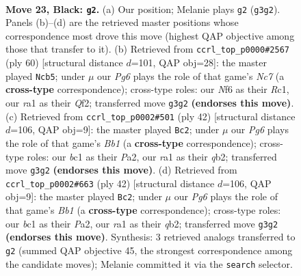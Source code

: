 \documentclass[11pt]{article}
\begin{document}
\clearpage

\begin{figure}[p]\centering
\begin{subfigure}{0.46\textwidth}\centering
\resizebox{\linewidth}{!}{%
\newchessgame
\chessboard[
  setfen={r1qk1b1r/p4pp1/3P1n1p/5P1P/B1n2Q2/6p1/8/R1B1K1NR b KQ - 4 23},
  showmover=false,
  pgfstyle=straightmove, color=movearrow, markmove={g3-g2}
]}
\caption{}
\end{subfigure}\hfill
\begin{subfigure}{0.46\textwidth}\centering
\resizebox{\linewidth}{!}{%
\newchessgame
\chessboard[
  setfen={1r4k1/2N1qpb1/3N2pp/3RP3/b4P2/r1p5/P4QPP/2R3K1 w - - 8 31},
  showmover=false,
  pgfstyle=straightmove, color=movearrow, markmove={c7-b5}
]}
\caption{}
\end{subfigure}
\\[4pt]
\begin{subfigure}{0.46\textwidth}\centering
\resizebox{\linewidth}{!}{%
\newchessgame
\chessboard[
  setfen={r1b2rk1/pp3p2/6p1/3PN2P/1b2N3/8/Pq2KP2/RB1Q3R w - - 0 22},
  showmover=false,
  pgfstyle=straightmove, color=movearrow, markmove={b1-c2}
]}
\caption{}
\end{subfigure}\hfill
\begin{subfigure}{0.46\textwidth}\centering
\resizebox{\linewidth}{!}{%
\newchessgame
\chessboard[
  setfen={r1b2rk1/pp3p2/6p1/3PN2P/1b2N3/8/Pq2KP2/RB1Q3R w - - 0 22},
  showmover=false,
  pgfstyle=straightmove, color=movearrow, markmove={b1-c2}
]}
\caption{}
\end{subfigure}
\caption{\textbf{Move 23, Black: \texttt{g2}.} (a) Our position; Melanie plays \texttt{g2} (\texttt{g3g2}). Panels (b)--(d) are the retrieved master positions whose correspondence most drove this move (highest QAP objective among those that transfer to it). (b) Retrieved from \texttt{ccrl\_top\_p0000\#2567} (ply 60) [structural distance $d$=101, QAP obj=28]: the master played \texttt{Ncb5}; under $\mu$ our \emph{Pg6} plays the role of that game's \emph{Nc7} (a \textbf{cross-type} correspondence); cross-type roles: our \emph{N}f6 as their \emph{R}c1, our \emph{r}a1 as their \emph{Q}f2; transferred move \texttt{g3g2} \textbf{(endorses this move)}. (c) Retrieved from \texttt{ccrl\_top\_p0002\#501} (ply 42) [structural distance $d$=106, QAP obj=9]: the master played \texttt{Bc2}; under $\mu$ our \emph{Pg6} plays the role of that game's \emph{Bb1} (a \textbf{cross-type} correspondence); cross-type roles: our \emph{b}c1 as their \emph{P}a2, our \emph{r}a1 as their \emph{q}b2; transferred move \texttt{g3g2} \textbf{(endorses this move)}. (d) Retrieved from \texttt{ccrl\_top\_p0002\#663} (ply 42) [structural distance $d$=106, QAP obj=9]: the master played \texttt{Bc2}; under $\mu$ our \emph{Pg6} plays the role of that game's \emph{Bb1} (a \textbf{cross-type} correspondence); cross-type roles: our \emph{b}c1 as their \emph{P}a2, our \emph{r}a1 as their \emph{q}b2; transferred move \texttt{g3g2} \textbf{(endorses this move)}. Synthesis: 3 retrieved analogs transferred to \texttt{g2} (summed QAP objective 45, the strongest correspondence among the candidate moves); Melanie committed it via the \texttt{search} selector.}
\label{fig:thought-m45}
\end{figure}
\end{document}
